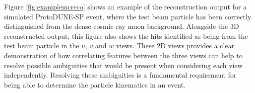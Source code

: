 Figure \ref{fig:examplemcreco} shows an example of the reconstruction output for a simulated ProtoDUNE-SP event, where the test beam particle has been correctly distinguished from the dense cosmic-ray muon background.  Alongside the 3D reconstructed output, this figure also shows the hits identified as being from the test beam particle in the $u$, $v$ and $w$ views.  These 2D views provides a clear demonstration of how correlating features between the three views can help to resolve possible ambiguities that would be present when considering each view independently.  Resolving these ambiguities is a fundamental requirement for being able to determine the particle kinematics in an event.

\begin{figure}
\centering
{} \\

\end{figure}
